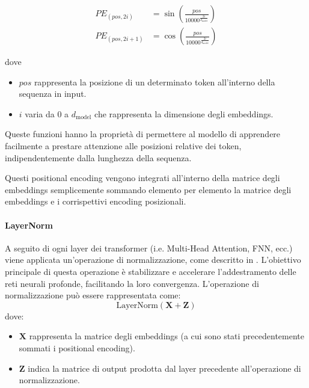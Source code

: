 \documentclass[12pt,a4paper,twoside,openright]{book}
\begin{document}
\begin{align*}
    PE_{(pos, 2i)} &= \sin \left( \frac{pos}{10000^{\frac{2i}{d_{\text{model}}}}} \right) \\
    PE_{(pos, 2i+1)} &= \cos \left( \frac{pos}{10000^{\frac{2i}{d_{\text{model}}}}} \right)
\end{align*}

dove 
\begin{itemize}
    \item $pos$ rappresenta la posizione di un determinato token all'interno della sequenza in input.
    \item $i$ varia da 0 a $d_{\text{model}}$ che rappresenta la dimensione degli embeddings. 
\end{itemize}

Queste funzioni hanno la proprietà di permettere al modello di apprendere facilmente a prestare attenzione alle posizioni relative dei token, indipendentemente dalla lunghezza della sequenza.

Questi positional encoding vengono integrati all'interno della matrice degli embeddings semplicemente sommando elemento per elemento la matrice degli embeddings e i corrispettivi encoding posizionali. 

\paragraph{LayerNorm} A seguito di ogni layer dei transformer (i.e. Multi-Head Attention, FNN, ecc.) viene applicata un'operazione di normalizzazione, come descritto in \cite{ba2016layer}. L'obiettivo principale di questa operazione è stabilizzare e accelerare l'addestramento delle reti neurali profonde, facilitando la loro convergenza. L'operazione di normalizzazione può essere rappresentata come:
\begin{equation*}
    \text{LayerNorm}(\mathbf{X} + \mathbf{Z})
\end{equation*}
dove:
\begin{itemize}
    \item $\mathbf{X}$ rappresenta la matrice degli embeddings (a cui sono stati precedentemente sommati i positional encoding).
    \item $\mathbf{Z}$ indica la matrice di output prodotta dal layer precedente all'operazione di normalizzazione.
\end{itemize}
\end{document}
